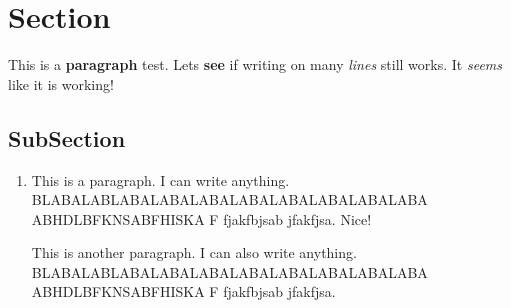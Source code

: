 \documentclass[12pt,]{article}
\begin{document}
	\section*{Section}

		This is a \textbf{paragraph} test. Lets \textbf{see} if writing on many \textit{lines} still works. It \textit{seems} like it is working!

		\subsection{SubSection}

			\begin{enumerate}

				\item
				This is a paragraph. I can write anything. BLABALABLABALABALABALABALABALABALABALABA ABHDLBFKNSABFHISKA F fjakfbjsab jfakfjsa. Nice!

				This is another paragraph. I can also write anything. BLABALABLABALABALABALABALABALABALABALABA ABHDLBFKNSABFHISKA F fjakfbjsab jfakfjsa.

			\end{enumerate}
\end{document}
